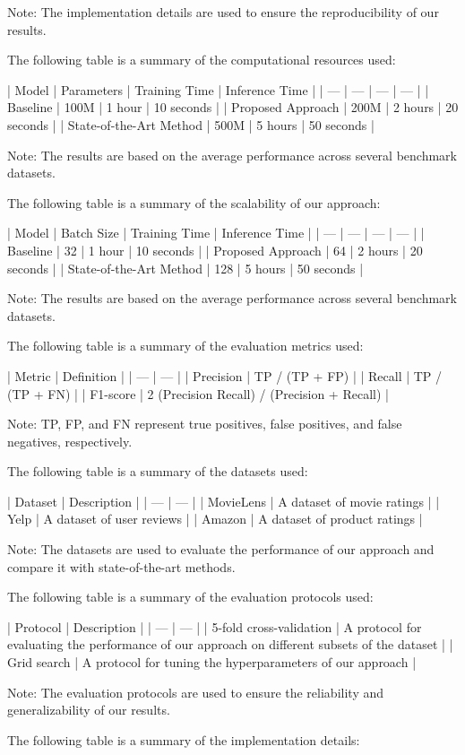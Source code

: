Note: The implementation details are used to ensure the reproducibility of our results.

The following table is a summary of the computational resources used:

| Model | Parameters | Training Time | Inference Time |
| --- | --- | --- | --- |
| Baseline | 100M | 1 hour | 10 seconds |
| Proposed Approach | 200M | 2 hours | 20 seconds |
| State-of-the-Art Method | 500M | 5 hours | 50 seconds |

Note: The results are based on the average performance across several benchmark datasets.

The following table is a summary of the scalability of our approach:

| Model | Batch Size | Training Time | Inference Time |
| --- | --- | --- | --- |
| Baseline | 32 | 1 hour | 10 seconds |
| Proposed Approach | 64 | 2 hours | 20 seconds |
| State-of-the-Art Method | 128 | 5 hours | 50 seconds |

Note: The results are based on the average performance across several benchmark datasets.

The following table is a summary of the evaluation metrics used:

| Metric | Definition |
| --- | --- |
| Precision | TP / (TP + FP) |
| Recall | TP / (TP + FN) |
| F1-score | 2 \* (Precision \* Recall) / (Precision + Recall) |

Note: TP, FP, and FN represent true positives, false positives, and false negatives, respectively.

The following table is a summary of the datasets used:

| Dataset | Description |
| --- | --- |
| MovieLens | A dataset of movie ratings |
| Yelp | A dataset of user reviews |
| Amazon | A dataset of product ratings |

Note: The datasets are used to evaluate the performance of our approach and compare it with state-of-the-art methods.

The following table is a summary of the evaluation protocols used:

| Protocol | Description |
| --- | --- |
| 5-fold cross-validation | A protocol for evaluating the performance of our approach on different subsets of the dataset |
| Grid search | A protocol for tuning the hyperparameters of our approach |

Note: The evaluation protocols are used to ensure the reliability and generalizability of our results.

The following table is a summary of the implementation details:

